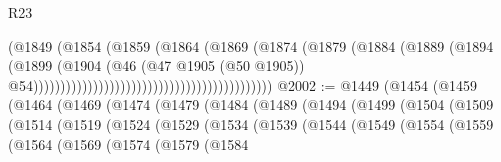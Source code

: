 \begin{lexlean}{R23}
\begin{coremodule}
{{{{{{{{{{{{{{{{{{{{{                                                                  (@1849
                                                                    (@1854
                                                                      (@1859
                                                                        (@1864
                                                                          (@1869
                                                                            (@1874
                                                                              (@1879
                                                                                (@1884
                                                                                  (@1889
                                                                                    (@1894
                                                                                      (@1899
                                                                                        (@1904
                                                                                          (@46
                                                                                            (@47
                                                                                              @1905
                                                                                              (@50
                                                                                                @1905))
                                                                                            @54))))))))))))))))))))))))))))))))))))))))))))
@2002 := @1449
    (@1454
      (@1459
        (@1464
          (@1469
            (@1474
              (@1479
                (@1484
                  (@1489
                    (@1494
                      (@1499
                        (@1504
                          (@1509
                            (@1514
                              (@1519
                                (@1524
                                  (@1529
                                    (@1534
                                      (@1539
                                        (@1544
                                          (@1549
                                            (@1554
                                              (@1559
                                                (@1564
                                                  (@1569
                                                    (@1574
                                                      (@1579
                                                        (@1584
}}}}}}}}}}}}}}}}}}}}}
\end{coremodule}
\end{lexlean}
